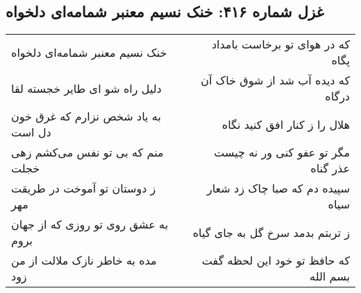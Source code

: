 \begin{center}
\section*{غزل شماره ۴۱۶: خنک نسیم معنبر شمامه‌ای دلخواه}
\label{sec:sh416}
\begin{longtable}{l p{0.5cm} r}
خنک نسیم معنبر شمامه‌ای دلخواه
&&
که در هوای تو برخاست بامداد پگاه
\\
دلیل راه شو ای طایر خجسته لقا
&&
که دیده آب شد از شوق خاک آن درگاه
\\
به یاد شخص نزارم که غرق خون دل است
&&
هلال را ز کنار افق کنید نگاه
\\
منم که بی تو نفس می‌کشم زهی خجلت
&&
مگر تو عفو کنی ور نه چیست عذر گناه
\\
ز دوستان تو آموخت در طریقت مهر
&&
سپیده دم که صبا چاک زد شعار سیاه
\\
به عشق روی تو روزی که از جهان بروم
&&
ز تربتم بدمد سرخ گل به جای گیاه
\\
مده به خاطر نازک ملالت از من زود
&&
که حافظ تو خود این لحظه گفت بسم الله
\\
\end{longtable}
\end{center}
